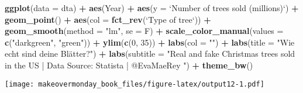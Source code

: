 \documentclass[]{book}
\newenvironment{Shaded}{\begin{snugshade}}{\end{snugshade}}
\newcommand{\KeywordTok}[1]{\textcolor[rgb]{0.13,0.29,0.53}{\textbf{#1}}}
\newcommand{\DataTypeTok}[1]{\textcolor[rgb]{0.13,0.29,0.53}{#1}}
\newcommand{\DecValTok}[1]{\textcolor[rgb]{0.00,0.00,0.81}{#1}}
\newcommand{\StringTok}[1]{\textcolor[rgb]{0.31,0.60,0.02}{#1}}
\newcommand{\OperatorTok}[1]{\textcolor[rgb]{0.81,0.36,0.00}{\textbf{#1}}}
\newcommand{\NormalTok}[1]{#1}
\theoremstyle{definition}
\theoremstyle{definition}
\theoremstyle{definition}
\theoremstyle{remark}
\begin{document}
\begin{Shaded}
\begin{Highlighting}[]
\KeywordTok{ggplot}\NormalTok{(}\DataTypeTok{data =}\NormalTok{ dta) }\OperatorTok{+}
\StringTok{  }\KeywordTok{aes}\NormalTok{(Year) }\OperatorTok{+}
\StringTok{  }\KeywordTok{aes}\NormalTok{(}\DataTypeTok{y =} \StringTok{`}\DataTypeTok{Number of trees sold (millions)}\StringTok{`}\NormalTok{) }\OperatorTok{+}
\StringTok{  }\KeywordTok{geom_point}\NormalTok{() }\OperatorTok{+}
\StringTok{  }\KeywordTok{aes}\NormalTok{(}\DataTypeTok{col =} \KeywordTok{fct_rev}\NormalTok{(}\StringTok{`}\DataTypeTok{Type of tree}\StringTok{`}\NormalTok{)) }\OperatorTok{+}
\StringTok{  }\KeywordTok{geom_smooth}\NormalTok{(}\DataTypeTok{method =} \StringTok{"lm"}\NormalTok{, }\DataTypeTok{se =}\NormalTok{ F) }\OperatorTok{+}
\StringTok{  }\KeywordTok{scale_color_manual}\NormalTok{(}\DataTypeTok{values =} \KeywordTok{c}\NormalTok{(}\StringTok{"darkgreen"}\NormalTok{, }\StringTok{"green"}\NormalTok{)) }\OperatorTok{+}
\StringTok{  }\KeywordTok{ylim}\NormalTok{(}\KeywordTok{c}\NormalTok{(}\DecValTok{0}\NormalTok{, }\DecValTok{35}\NormalTok{)) }\OperatorTok{+}
\StringTok{  }\KeywordTok{labs}\NormalTok{(}\DataTypeTok{col =} \StringTok{""}\NormalTok{) }\OperatorTok{+}
\StringTok{  }\KeywordTok{labs}\NormalTok{(}\DataTypeTok{title =} \StringTok{"Wie echt sind deine Blätter?"}\NormalTok{) }\OperatorTok{+}
\StringTok{  }\KeywordTok{labs}\NormalTok{(}\DataTypeTok{subtitle =} \StringTok{"Real and fake Christmas trees sold in the US | Data Source: Statista | @EvaMaeRey "}\NormalTok{) }\OperatorTok{+}
\StringTok{  }\KeywordTok{theme_bw}\NormalTok{() }
\end{Highlighting}
\end{Shaded}

\texttt{[image: makeovermonday\_book\_files/figure-latex/output12-1.pdf]}
\end{document}
